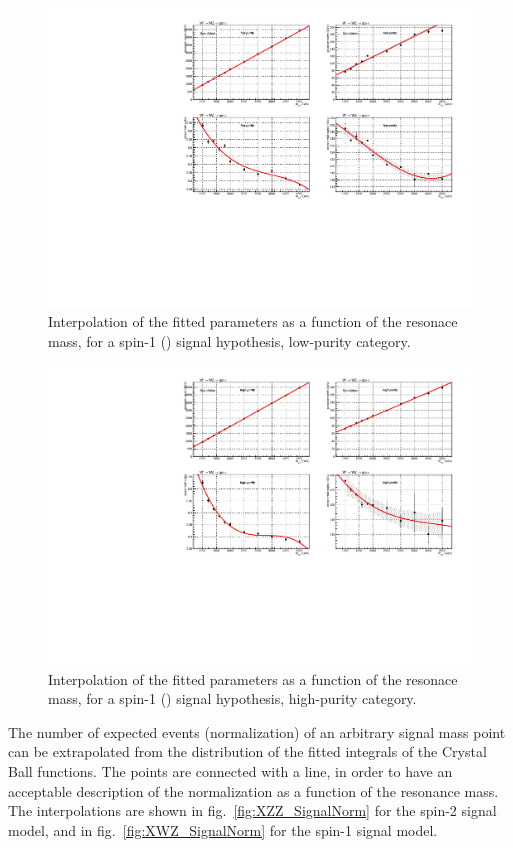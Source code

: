 \begin{figure}[!htb]
  \centering
    \includegraphics[width=.95\textwidth]{plotsAlpha_tesi/XVZnnlp/XWZInv_SignalShape.pdf}
  \caption{Interpolation of the fitted parameters as a function of the resonace mass, for a spin-1 (\Wp) signal hypothesis, low-purity category.}
  \label{fig:XWZ_SignalShapeLP}
\end{figure}

\begin{figure}[!htb]
  \centering
    \includegraphics[width=.95\textwidth]{plotsAlpha_tesi/XVZnnhp/XWZInv_SignalShape.pdf}

  \caption{Interpolation of the fitted parameters as a function of the resonace mass, for a spin-1 (\Wp) signal hypothesis, high-purity category.}
  \label{fig:XWZ_SignalShapeHP}
\end{figure}


\noindent The number of expected events (normalization) of an arbitrary signal mass point can be extrapolated from the distribution of the fitted integrals of the Crystal Ball functions. The points are connected with a line, in order to have an acceptable description of the normalization as a function of the resonance mass. The interpolations are shown in fig.~\ref{fig:XZZ_SignalNorm} for the spin-2 signal model, and in fig.~\ref{fig:XWZ_SignalNorm} for the spin-1 signal model.%

